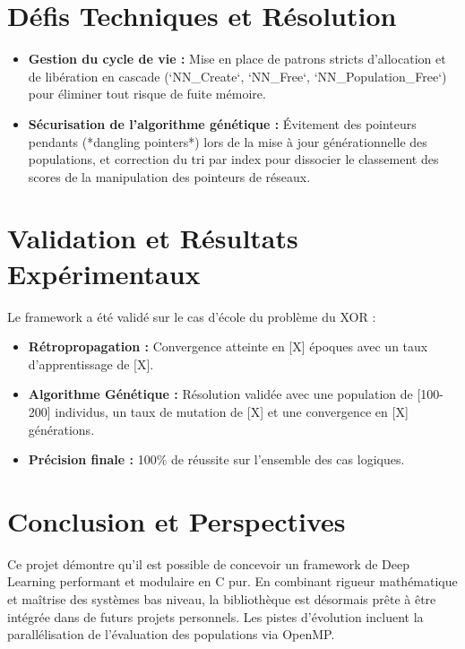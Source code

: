 \documentclass[11pt,a4paper]{article}
\begin{document}
\section{Défis Techniques et Résolution}
\begin{itemize}
    \item \textbf{Gestion du cycle de vie :} Mise en place de patrons stricts d'allocation et de libération en cascade (`NN\_Create`, `NN\_Free`, `NN\_Population\_Free`) pour éliminer tout risque de fuite mémoire.
    \item \textbf{Sécurisation de l'algorithme génétique :} Évitement des pointeurs pendants (*dangling pointers*) lors de la mise à jour générationnelle des populations, et correction du tri par index pour dissocier le classement des scores de la manipulation des pointeurs de réseaux.
\end{itemize}

\section{Validation et Résultats Expérimentaux}
Le framework a été validé sur le cas d'école du problème du XOR :
\begin{itemize}
    \item \textbf{Rétropropagation :} Convergence atteinte en [X] époques avec un taux d'apprentissage de [X].
    \item \textbf{Algorithme Génétique :} Résolution validée avec une population de [100-200] individus, un taux de mutation de [X] et une convergence en [X] générations.
    \item \textbf{Précision finale :} 100\% de réussite sur l'ensemble des cas logiques.
\end{itemize}

\section{Conclusion et Perspectives}
Ce projet démontre qu'il est possible de concevoir un framework de Deep Learning performant et modulaire en C pur. En combinant rigueur mathématique et maîtrise des systèmes bas niveau, la bibliothèque est désormais prête à être intégrée dans de futurs projets personnels. Les pistes d'évolution incluent la parallélisation de l'évaluation des populations via OpenMP.
\end{document}
